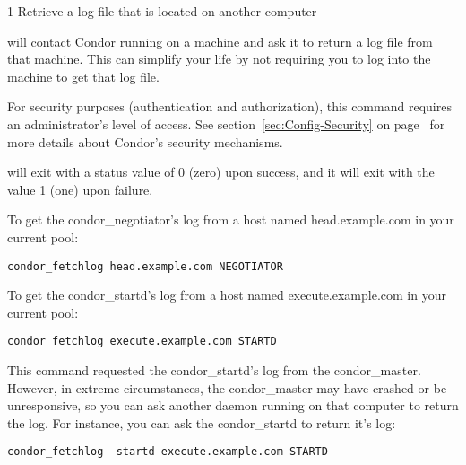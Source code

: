 \begin{ManPage}{\label{man-condor-fetchlog}}{1}
{Retrieve a log file that is located on another computer}
\Synopsis 
{}
\ToolArgsBase
{}
\ToolArgsAffect
{}


\Description 

 will contact Condor running on a machine and ask it
to return a log file from that machine. This can simplify your life by
not requiring you to log into the machine to get that log file. 

For security purposes (authentication and authorization), this command
requires an administrator's level of access. See section~\ref{sec:Config-Security} 
on page~\pageref{sec:Config-Security} for more details about Condor's
security mechanisms.

\begin{Options}
	\ToolArgsBaseDesc
	\ToolArgsAffectDesc
\end{Options}

\ExitStatus
{} will exit with a status value of 0 (zero) upon success,
and it will exit with the value 1 (one) upon failure.

\Examples
To get the condor\_negotiator's log from a host named head.example.com
in your current pool:
\begin{verbatim}
condor_fetchlog head.example.com NEGOTIATOR
\end{verbatim}

To get the condor\_startd's log from a host named execute.example.com
in your current pool:
\begin{verbatim}
condor_fetchlog execute.example.com STARTD
\end{verbatim}

This command requested the condor\_startd's log from the
condor\_master. However, in extreme circumstances, the condor\_master
may have crashed or be unresponsive, so you can ask another daemon
running on that computer to return the log. For instance, you can ask
the condor\_startd to return it's log:

\begin{verbatim}
condor_fetchlog -startd execute.example.com STARTD
\end{verbatim}

\end{ManPage}

